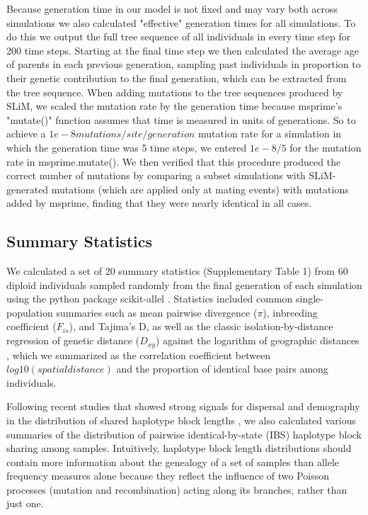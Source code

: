 \documentclass[9pt,twocolumn,twoside]{gsajnl}
\begin{document}
Because generation time in our model is not fixed and may vary both across simulations we also calculated "effective" generation times for all simulations. To do this we output the full tree sequence of all individuals in every time step for 200 time steps. Starting at the final time step we then calculated the average age of parents in each previous generation, sampling past individuals in proportion to their genetic contribution to the final generation, which can be extracted from the tree sequence. When adding mutations to the tree sequences produced by SLiM, we scaled the mutation rate by the generation time because msprime's "mutate()" function assumes that time is measured in units of generations. So to achieve a $1e-8 mutations/site/generation$ mutation rate for a simulation in which the generation time was 5 time steps, we entered $1e-8/5$ for the mutation rate in msprime.mutate(). We then verified that this procedure produced the correct number of mutations by comparing a subset simulations with SLiM-generated mutations (which are applied only at mating events) with mutations added by msprime, finding that they were nearly identical in all cases.    
\subsection{Summary Statistics}
We calculated a set of 20 summary statistics (Supplementary Table 1) from 60 diploid individuals sampled randomly from the final generation of each simulation using the python package scikit-allel \citep{Miles2017}. Statistics included common single-population summaries such as mean pairwise divergence ($\pi$), inbreeding coefficient ($F_{is}$), and Tajima's D, as well as the classic isolation-by-distance regression of genetic distance ($D_{xy}$) against the logarithm of geographic distances \citep{Rousset1997}, which we summarized as the correlation coefficient between $log10(spatial distance)$ and the proportion of identical base pairs among individuals. 

Following recent studies that showed strong signals for dispersal and demography in the distribution of shared haplotype block lengths \citep{Ringbauer2017,Baharian2016}, we also calculated various summaries of the distribution of pairwise identical-by-state (IBS) haplotype block sharing among samples. Intuitively, haplotype block length distributions should contain more information about the genealogy of a set of samples than allele frequency measures alone because they reflect the influence of two Poisson processes (mutation and recombination) acting along its branches, rather than just one. 
\end{document}

